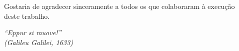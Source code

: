 \documentclass[
	12pt,				%
	oneside,			%
	a4paper,			%
	chapter=TITLE,		%
	section=TITLE,		%
	english,			%
	brazil				%
	]{abntex2}
\begin{document}
\begin{folhadeaprovacao}
	\vspace*{\fill}
	\centering
\end{folhadeaprovacao}


\begin{agradecimentos}
	Gostaria de agradecer sinceramente a todos os que colaboraram à execução\\
deste trabalho.
\end{agradecimentos}

\begin{epigrafe}
	\vspace*{\fill}
	\begin{flushright}
		\textit{``Eppur si muove!''\\
(Galileu Galilei, 1633)}
	\end{flushright}
\end{epigrafe}

\end{document}
